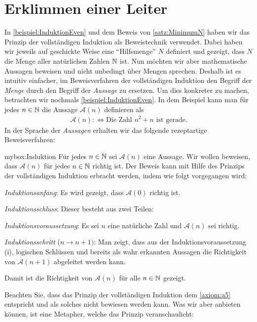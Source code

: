 \section{Erklimmen einer Leiter}
In \cref{beispiel:InduktionEven} und dem Beweis von \cref{satz:MinimumN} haben wir das Prinzip der vollständigen Induktion als Beweistechnik verwendet. Dabei haben wir jeweils auf geschickte Weise eine \enquote{Hilfsmenge} $N$ definiert und gezeigt, dass $N$ die Menge aller natürlichen Zahlen $\mathbb{N}$ ist. Nun möchten wir aber mathematische Aussagen beweisen und nicht unbedingt über Mengen sprechen. Deshalb ist es intuitiv einfacher, im Beweisverfahren der vollständigen Induktion den Begriff der \textit{Menge} durch den Begriff der \textit{Aussage} zu ersetzen. Um dies konkreter zu machen, betrachten wir nochmals \cref{beispiel:InduktionEven}. In dem Beispiel kann man für jedes $n\in\mathbb{N}$ die Aussage $\mathcal{A}(n)$ definieren als
\begin{align*}
    \mathcal{A}(n) :\iff \text{Die Zahl $n^2 + n$ ist gerade}.
\end{align*}
In der Sprache der \textit{Aussagen} erhalten wir das folgende rezeptartige Beweisverfahren:
\begin{myBox}{mybox:Induktion}
Für jedes $n\in\mathbb{N}$ sei $\mathcal{A}(n)$ eine Aussage. Wir wollen beweisen, dass $\mathcal{A}(n)$ für jedes $n\in\mathbb{N}$ richtig ist. Der Beweis kann mit Hilfe des Prinzips der vollständigen Induktion erbracht werden, indem wie folgt vorgegangen wird:
\begin{aenum}
    \item \textit{Induktionsanfang}: Es wird gezeigt, dass $\mathcal{A}(0)$ richtig ist.
    \item \textit{Induktionsschluss}: Dieser besteht aus zwei Teilen:
        \begin{renum}
            \item \textit{Induktionsvoraussetzung}: Es sei $n$ eine natürliche Zahl und $\mathcal{A}(n)$ sei richtig.
            \item \textit{Induktionsschritt} ($n\to n+1)$: Man zeigt, dass aus der Induktionsvoraussetzung (i), logischen Schlüssen und bereits als wahr erkannten Aussagen die Richtigkeit von $\mathcal{A}(n+1)$ abgeleitet werden kann.
        \end{renum}
\end{aenum}
Damit ist die Richtigkeit von $\mathcal{A}(n)$ für alle $n\in\mathbb{N}$ gezeigt.
\end{myBox}
Beachten Sie, dass das Prinzip der vollständigen Induktion dem \cref{axiom:a5} entspricht und als solches nicht bewiesen werden kann. Was wir aber anbieten können, ist eine Metapher, welche das Prinzip veranschaulicht:
